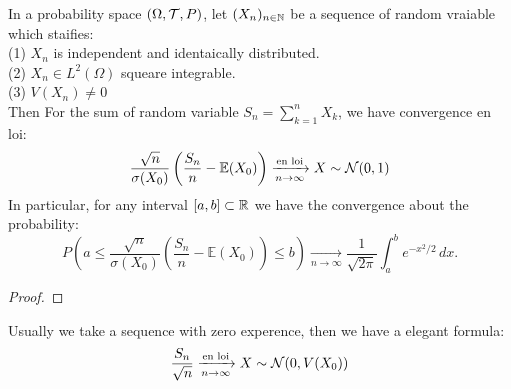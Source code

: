 \documentclass[en,geye,blue,normal,12pt,bibend=bibtex]{elegantnote}
\begin{document}
\begin{theorem}
    In a probability space \((\Omega ,\mathcal{T} ,P)\), let \((X_n)_{n \in \mathbb{N}}\) be a sequence of random vraiable which staifies:
    \\(1) \(X_n\) is independent and identaically distributed.
    \\(2) \(X_n \in L^2(\Omega)\) squeare integrable.
    \\(3) \(V(X_n) \neq 0\)
    \\Then For the sum of random variable \(S_n = \sum_{k=1}^{n}X_k\), we have convergence en loi:
    \[\frac{\sqrt{n}}{\sigma(X_0)} \left( \frac{S_n}{n} - \mathbb{E}(X_0) \right) \xrightarrow[n \rightarrow \infty]{\text{en loi}} X \sim \mathcal{N} ({0},{1})\]
    In particular, for any interval \([a,b] \subset \mathbb{R}\) we have the convergence about the probability:
    \[
P\left(
a \leq \frac{\sqrt{n}}{\sigma(X_0)} \left( \frac{S_n}{n} - \mathbb{E}(X_0) \right) \leq b
\right)
\xrightarrow[n \to \infty]{} 
\frac{1}{\sqrt{2\pi}} \int_a^b e^{-x^2/2} \, dx.
\]

\begin{proof}
    
\end{proof}
\end{theorem}

Usually we take a sequence with zero experence, then we have a elegant formula:
\[\frac{S_n}{\sqrt{n}} \xrightarrow[n \rightarrow \infty]{\text{en loi}} X \sim \mathcal{N} ({0},{V(X_0)})\]

\newpage 

\printbibliography
\end{document}
